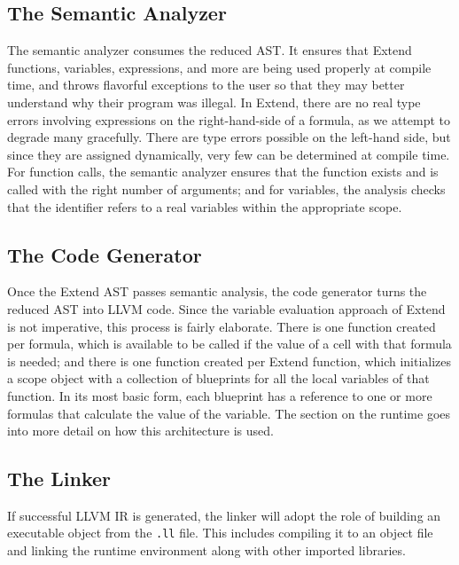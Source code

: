   \subsection{The Semantic Analyzer}
  The semantic analyzer consumes the reduced AST. It ensures that Extend functions, variables, expressions, and more are being used properly at compile time, and throws flavorful exceptions to the user so that they may better understand why their program was illegal. In Extend, there are no real type errors involving expressions on the right-hand-side of a formula, as we attempt to degrade many gracefully. There are type errors possible on the left-hand side, but since they are assigned dynamically, very few can be determined at compile time. For function calls, the semantic analyzer ensures that the function exists and is called with the right number of arguments; and for variables, the analysis checks that the identifier refers to a real variables within the appropriate scope.

  \subsection{The Code Generator}
 Once the Extend AST passes semantic analysis, the code generator turns the reduced AST into LLVM code. Since the variable evaluation approach of Extend is not imperative, this process is fairly elaborate. There is one function created per formula, which is available to be called if the value of a cell with that formula is needed; and there is one function created per Extend function, which initializes a scope object with a collection of blueprints for all the local variables of that function. In its most basic form, each blueprint has a reference to one or more formulas that calculate the value of the variable. The section on the runtime goes into more detail on how this architecture is used.

  \subsection{The Linker}
  If successful LLVM IR is generated, the linker will adopt the role of building an executable object from the \texttt{.ll} file. This includes compiling it to an object file and linking the runtime environment along with other imported libraries.

